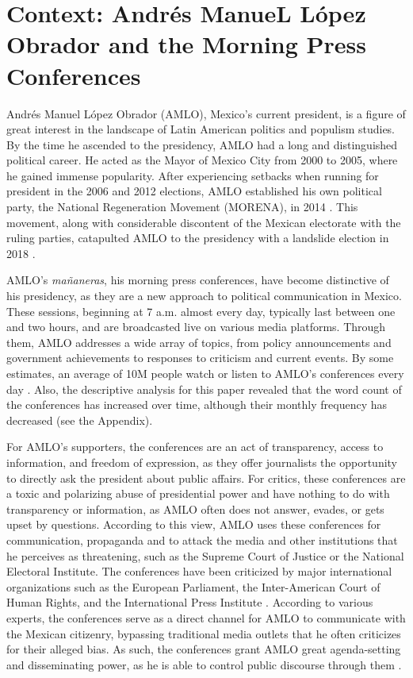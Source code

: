 \documentclass[]{article}
\begin{document}
\section{Context: Andrés ManueL López Obrador and the Morning Press Conferences}

Andrés Manuel López Obrador (AMLO), Mexico's current president, is a figure of great interest in the landscape of Latin American politics and populism studies. By the time he ascended to the presidency, AMLO had a long and distinguished political career. He acted as the Mayor of Mexico City from 2000 to 2005, where he gained immense popularity. After experiencing setbacks when running for president in the 2006 and 2012 elections, AMLO established his own political party, the National Regeneration Movement (MORENA), in 2014 \cite{navarrete_vela_morena_2019}. This movement, along with considerable discontent of the Mexican electorate with the ruling parties, catapulted AMLO to the presidency with a landslide election in 2018 \cite{moreno_viraje_nodate}. 

AMLO's \textit{mañaneras}, his morning press conferences, have become distinctive of his presidency, as they are a new approach to political communication in Mexico. These sessions, beginning at 7 a.m. almost every day, typically last between one and two hours, and are broadcasted live on various media platforms. Through them, AMLO addresses a wide array of topics, from policy announcements and government achievements to responses to criticism and current events. By some estimates, an average of 10M people watch or listen to AMLO's conferences every day \cite{bravo_5_2024}. Also, the descriptive analysis for this paper revealed that the word count of the conferences has increased over time, although their monthly frequency has decreased (see the Appendix). 

For AMLO's supporters, the conferences are an act of transparency, access to information, and freedom of expression, as they offer journalists the opportunity to directly ask the president about public affairs. For critics, these conferences are a toxic and polarizing abuse of presidential power and have nothing to do with transparency or information, as AMLO often does not answer, evades, or gets upset by questions. According to this view, AMLO uses these conferences for communication, propaganda and to attack the media and other institutions that he perceives as threatening, such as the Supreme Court of Justice or the National Electoral Institute. The conferences have been criticized by major international organizations such as the European Parliament, the Inter-American Court of Human Rights, and the International Press Institute \cite{najar_asi_2019}. According to various experts, the conferences serve as a direct channel for AMLO to communicate with the Mexican citizenry, bypassing traditional media outlets that he often criticizes for their alleged bias. As such, the conferences grant AMLO great agenda-setting and disseminating power, as he is able to control public discourse through them \cite{zapata_mananeras_2022}.
\end{document}
